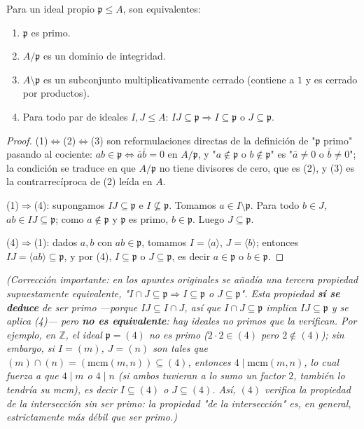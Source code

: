 \begin{prop}\label{prop:primo-equivalencias}
Para un ideal propio $\mathfrak p \leq A$, son equivalentes:
\begin{enumerate}
    \item $\mathfrak p$ es primo.
    \item $A/\mathfrak p$ es un dominio de integridad.
    \item $A\setminus \mathfrak p$ es un subconjunto multiplicativamente cerrado (contiene a $1$ y es cerrado por productos).
    \item Para todo par de ideales $I,J\leq A$: $IJ\subseteq \mathfrak p \Rightarrow I\subseteq \mathfrak p$ o $J\subseteq \mathfrak p$.
\end{enumerate}
\end{prop}
\begin{proof}
(1)$\Leftrightarrow$(2)$\Leftrightarrow$(3) son reformulaciones directas de la definición de "$\mathfrak p$ primo" pasando al cociente: $ab\in\mathfrak p \Leftrightarrow \bar a\bar b=0$ en $A/\mathfrak p$, y "$a\notin \mathfrak p$ o $b\notin \mathfrak p$" es "$\bar a\neq 0$ o $\bar b\neq 0$"; la condición se traduce en que $A/\mathfrak p$ no tiene divisores de cero, que es (2), y (3) es la contrarrecíproca de (2) leída en $A$.

(1)$\Rightarrow$(4): supongamos $IJ\subseteq \mathfrak p$ e $I\not\subseteq \mathfrak p$. Tomamos $a\in I\setminus \mathfrak p$. Para todo $b\in J$, $ab\in IJ\subseteq \mathfrak p$; como $a\notin \mathfrak p$ y $\mathfrak p$ es primo, $b\in \mathfrak p$. Luego $J\subseteq \mathfrak p$.

(4)$\Rightarrow$(1): dados $a,b$ con $ab\in \mathfrak p$, tomamos $I=\langle a\rangle$, $J=\langle b\rangle$; entonces $IJ=\langle ab\rangle \subseteq \mathfrak p$, y por (4), $I\subseteq \mathfrak p$ o $J\subseteq \mathfrak p$, es decir $a\in \mathfrak p$ o $b\in\mathfrak p$.
\end{proof}

\emph{(Corrección importante: en los apuntes originales se añadía una tercera propiedad supuestamente equivalente, "$I\cap J\subseteq \mathfrak p \Rightarrow I\subseteq \mathfrak p$ o $J\subseteq \mathfrak p$". Esta propiedad \textbf{sí se deduce} de ser primo —porque $IJ\subseteq I\cap J$, así que $I\cap J\subseteq \mathfrak p$ implica $IJ\subseteq \mathfrak p$ y se aplica (4)— pero \textbf{no es equivalente}: hay ideales no primos que la verifican. Por ejemplo, en $\mathbb{Z}$, el ideal $\mathfrak p=(4)$ no es primo ($2\cdot 2\in (4)$ pero $2\notin (4)$); sin embargo, si $I=(m)$, $J=(n)$ son tales que $(m)\cap(n)=(\mathrm{mcm}(m,n))\subseteq (4)$, entonces $4\mid \mathrm{mcm}(m,n)$, lo cual fuerza a que $4\mid m$ o $4\mid n$ (si ambos tuvieran a lo sumo un factor $2$, también lo tendría su mcm), es decir $I\subseteq (4)$ o $J\subseteq (4)$. Así, $(4)$ verifica la propiedad de la intersección sin ser primo: la propiedad "de la intersección" es, en general, estrictamente más débil que ser primo.)}

